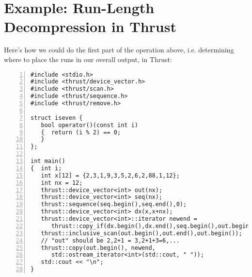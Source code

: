 \section{Example:  Run-Length Decompression in Thrust}
\label{thrustrunlength}

Here's how we could do the first part of the operation above, i.e.
determining where to place the runs in our overall output, in Thrust:

\begin{lstlisting}[numbers=left]
#include <stdio.h>
#include <thrust/device_vector.h>
#include <thrust/scan.h>
#include <thrust/sequence.h>
#include <thrust/remove.h>  

struct iseven {
   bool operator()(const int i)
   {  return (i % 2) == 0;
   }
};

int main()
{  int i;
   int x[12] = {2,3,1,9,3,5,2,6,2,88,1,12};
   int nx = 12;
   thrust::device_vector<int> out(nx);
   thrust::device_vector<int> seq(nx);
   thrust::sequence(seq.begin(),seq.end(),0);
   thrust::device_vector<int> dx(x,x+nx);
   thrust::device_vector<int>::iterator newend =
      thrust::copy_if(dx.begin(),dx.end(),seq.begin(),out.begin(),iseven());
   thrust::inclusive_scan(out.begin(),out.end(),out.begin());
   // "out" should be 2,2+1 = 3,2+1+3=6,...
   thrust::copy(out.begin(), newend,
      std::ostream_iterator<int>(std::cout, " "));
   std::cout << "\n";
}
\end{lstlisting}

